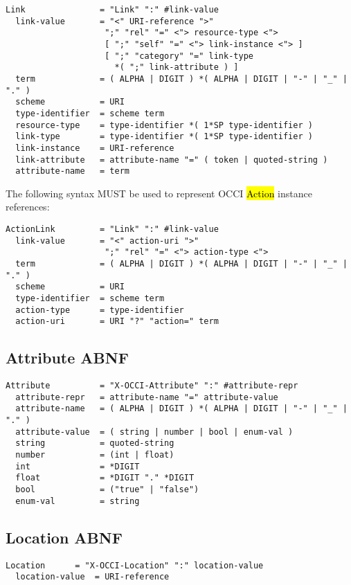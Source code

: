 \documentclass[10pt,a4paper]{article}
\begin{document}
\begin{verbatim}
Link               = "Link" ":" #link-value
  link-value       = "<" URI-reference ">"
                    ";" "rel" "=" <"> resource-type <">
                    [ ";" "self" "=" <"> link-instance <"> ]
                    [ ";" "category" "=" link-type
                      *( ";" link-attribute ) ]
  term             = ( ALPHA | DIGIT ) *( ALPHA | DIGIT | "-" | "_" | "." )
  scheme           = URI
  type-identifier  = scheme term
  resource-type    = type-identifier *( 1*SP type-identifier )
  link-type        = type-identifier *( 1*SP type-identifier )
  link-instance    = URI-reference
  link-attribute   = attribute-name "=" ( token | quoted-string )
  attribute-name   = term
\end{verbatim}

The following syntax MUST be used to represent OCCI \hl{Action}
instance references:

\begin{verbatim}
ActionLink         = "Link" ":" #link-value
  link-value       = "<" action-uri ">"
                    ";" "rel" "=" <"> action-type <">
  term             = ( ALPHA | DIGIT ) *( ALPHA | DIGIT | "-" | "_" | "." )
  scheme           = URI
  type-identifier  = scheme term
  action-type      = type-identifier
  action-uri       = URI "?" "action=" term
\end{verbatim}

\subsection{Attribute ABNF}

\begin{verbatim}
Attribute          = "X-OCCI-Attribute" ":" #attribute-repr
  attribute-repr   = attribute-name "=" attribute-value
  attribute-name   = ( ALPHA | DIGIT ) *( ALPHA | DIGIT | "-" | "_" | "." )
  attribute-value  = ( string | number | bool | enum-val )
  string           = quoted-string
  number           = (int | float)
  int              = *DIGIT
  float            = *DIGIT "." *DIGIT
  bool             = ("true" | "false")
  enum-val         = string
\end{verbatim}

\subsection{Location ABNF}

\begin{verbatim}
Location      = "X-OCCI-Location" ":" location-value
  location-value  = URI-reference
\end{verbatim}
\end{document}
